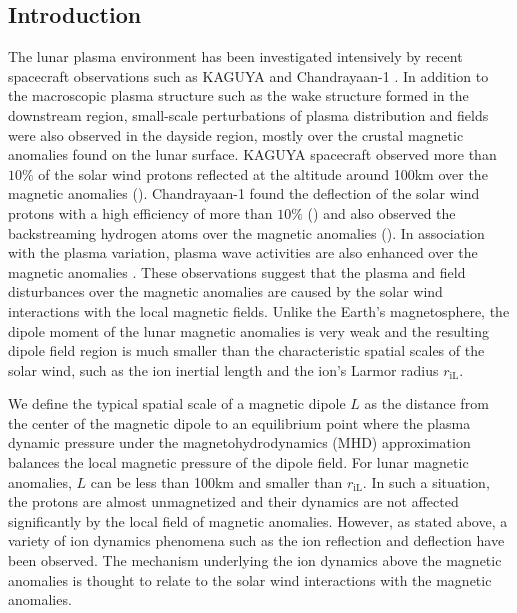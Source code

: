 \documentclass[draft,jgrga]{agutex2015}
\begin{document}
%

\begin{article}

%
%

\section{Introduction}
The lunar plasma environment has been  investigated 
intensively by recent spacecraft observations  such as
KAGUYA \citep[e.g.][]{Saito2008,Saito2010,Saito2012} and
Chandrayaan-1 \citep[e.g.][]{Barabash2009,Bhardwaj2010}.
In addition to the macroscopic plasma structure
such as the wake structure formed in the downstream region,
small-scale perturbations of plasma distribution and fields were also
 observed in the dayside region,
mostly over the crustal magnetic anomalies found on the lunar surface.
KAGUYA spacecraft observed
more than $10 \%$ of the solar wind protons reflected at the altitude around 100km
over the magnetic anomalies (\cite{Saito2010}).
Chandrayaan-1 found the deflection of the solar wind protons with
a high efficiency of more than $ 10 \%$ (\cite{Lue2011}) and
also observed the backstreaming hydrogen atoms over the magnetic anomalies (\cite{Wieser2010}).
In association with the plasma variation,
plasma wave activities are also enhanced over the magnetic anomalies
\citep[e.g.][]{Halekas2006a,Hashimoto2010}.
These observations suggest that the plasma and field disturbances over
the magnetic anomalies are caused by the solar wind interactions
with the local magnetic fields.
Unlike the Earth's magnetosphere, %
the dipole moment of
the lunar magnetic anomalies is very weak and
the resulting dipole field region is much smaller than the characteristic spatial scales
of the solar wind, such as the ion inertial length and the ion's Larmor radius $r_\mathrm{iL}$.



We define  the typical spatial scale of a magnetic dipole $L$ 
as the distance from the center of the magnetic dipole 
to an equilibrium point 
where the plasma dynamic pressure under the magnetohydrodynamics (MHD) approximation 
balances  the local magnetic pressure of the dipole field.
For lunar magnetic anomalies,
$L$ can be less than 100km and smaller than $r_\mathrm{iL}$.
In such a situation,
the protons are almost unmagnetized and their dynamics are not affected significantly 
by the local field of magnetic anomalies.
However, as stated above,
a variety of ion dynamics phenomena such as the ion reflection and deflection have been observed.
The mechanism underlying the ion dynamics above the magnetic anomalies is thought to relate
to the solar wind interactions with the magnetic anomalies.


\end{article}
\end{document}
